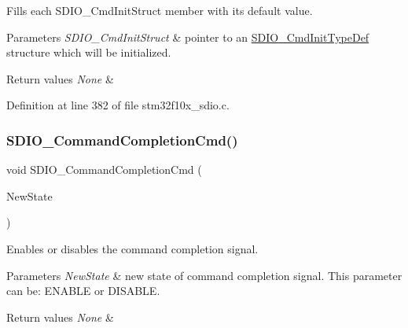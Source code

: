 Fills each S\+D\+I\+O\+\_\+\+Cmd\+Init\+Struct member with its default value. 


\begin{DoxyParams}{Parameters}
{\em S\+D\+I\+O\+\_\+\+Cmd\+Init\+Struct} & pointer to an \hyperlink{struct_s_d_i_o___cmd_init_type_def}{S\+D\+I\+O\+\_\+\+Cmd\+Init\+Type\+Def} structure which will be initialized. \\
\hline
\end{DoxyParams}

\begin{DoxyRetVals}{Return values}
{\em None} & \\
\hline
\end{DoxyRetVals}


Definition at line 382 of file stm32f10x\+\_\+sdio.\+c.

\mbox{\label{group___s_d_i_o___exported___functions_ga1bbe98c629812bc62121d9c8b2c5e21b}} 
\subsubsection{\texorpdfstring{S\+D\+I\+O\+\_\+\+Command\+Completion\+Cmd()}{SDIO\_CommandCompletionCmd()}}
{\footnotesize\ttfamily void S\+D\+I\+O\+\_\+\+Command\+Completion\+Cmd (\begin{DoxyParamCaption}\item[{\hyperlink{group___exported__types_gac9a7e9a35d2513ec15c3b537aaa4fba1}{Functional\+State}}]{New\+State }\end{DoxyParamCaption})}



Enables or disables the command completion signal. 


\begin{DoxyParams}{Parameters}
{\em New\+State} & new state of command completion signal. This parameter can be\+: E\+N\+A\+B\+LE or D\+I\+S\+A\+B\+LE. \\
\hline
\end{DoxyParams}

\begin{DoxyRetVals}{Return values}
{\em None} & \\
\hline
\end{DoxyRetVals}


